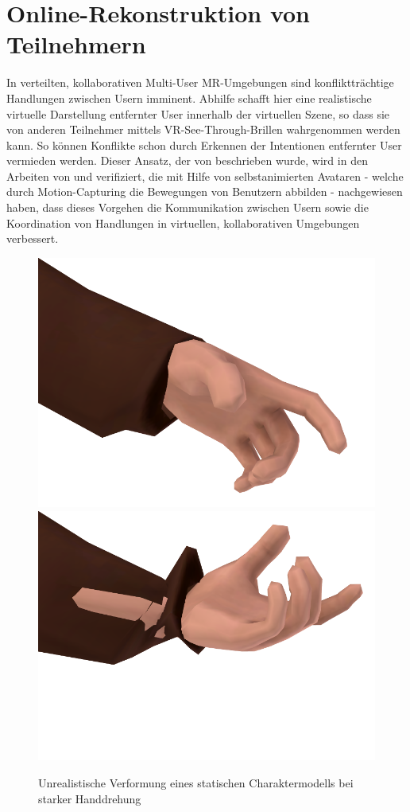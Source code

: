 \section{Online-Rekonstruktion von Teilnehmern}
\label{sec:user_reconstruction}


In verteilten, kollaborativen Multi-User MR-Umgebungen sind konfliktträchtige 
Handlungen zwischen Usern imminent. Abhilfe schafft hier eine realistische 
virtuelle Darstellung entfernter User innerhalb der virtuellen Szene, so dass 
sie von anderen Teilnehmer mittels VR-See-Through-Brillen wahrgenommen werden 
kann. So können Konflikte schon durch Erkennen der Intentionen entfernter User 
vermieden werden. Dieser Ansatz, der von \cite{Cassell:2000:ECI:332051.332075} 
beschrieben wurde, wird in den Arbeiten von \cite{mcmanus2011influence} und 
\cite{dodds2011talk} verifiziert, die mit Hilfe von selbstanimierten Avataren 
- welche durch Motion-Capturing die Bewegungen von Benutzern abbilden - 
nachgewiesen haben, dass dieses Vorgehen die Kommunikation zwischen Usern sowie 
die Koordination von Handlungen in virtuellen, kollaborativen Umgebungen 
verbessert.

\begin{figure}[H]
	\centering
	\includegraphics[width=.3\textwidth]{figs/anim-ok}
	\includegraphics[width=.3\textwidth]{figs/anim-prob}
	\caption{Unrealistische Verformung eines statischen Charaktermodells bei 
	starker Handdrehung}
	\label{fig:animationproblem}
\end{figure}

